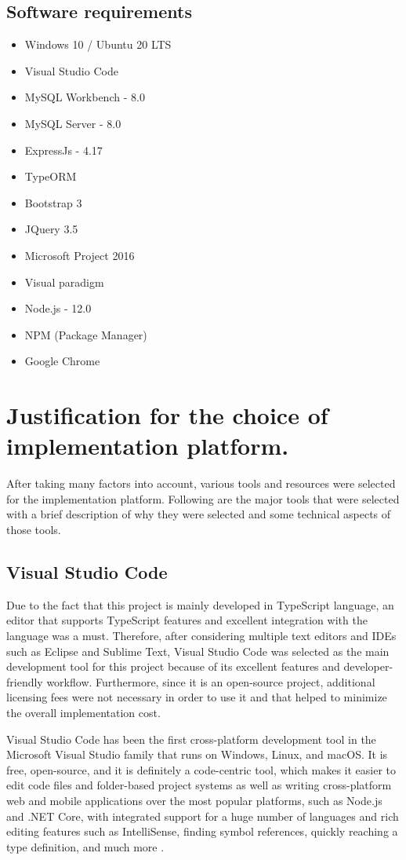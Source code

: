 \documentclass[12pt]{report}
\begin{document}
\subsection{Software requirements}
\begin{itemize}
	\item Windows 10 / Ubuntu 20 LTS
	\item Visual Studio Code
	\item MySQL Workbench - 8.0
	\item MySQL Server - 8.0
	\item ExpressJs - 4.17
	\item TypeORM
	\item Bootstrap 3
	\item JQuery 3.5
	\item Microsoft Project 2016
	\item Visual paradigm
	\item Node.js - 12.0
	\item NPM (Package Manager)
	\item Google Chrome
\end{itemize}


\section{Justification for the choice of implementation platform.}
After taking many factors into account, various tools and resources were selected for the implementation platform. Following are the major tools that were selected with a brief description of why they were selected and some technical aspects of those tools.

\subsection{Visual Studio Code}
Due to the fact that this project is mainly developed in TypeScript language, an editor that supports TypeScript features and excellent integration with the language was a must. Therefore, after considering multiple text editors and IDEs such as Eclipse and Sublime Text, Visual Studio Code was selected as the main development tool for this project because of its excellent features and developer-friendly workflow. Furthermore, since it is an open-source project, additional licensing fees were not necessary in order to use it and that helped to minimize the overall implementation cost.

Visual Studio Code has been the first cross-platform development tool in the Microsoft Visual Studio family that runs on Windows, Linux, and macOS. It is free, open-source, and it is definitely a code-centric tool, which makes it easier to edit code files and folder-based project systems as well as writing cross-platform web and mobile applications over the most popular platforms, such as Node.js and .NET Core, with integrated support for a huge number of languages and rich editing features such as IntelliSense, finding symbol references, quickly reaching a type definition, and much more \cite{alessandro_2019_visual_studio}.
\end{document}
